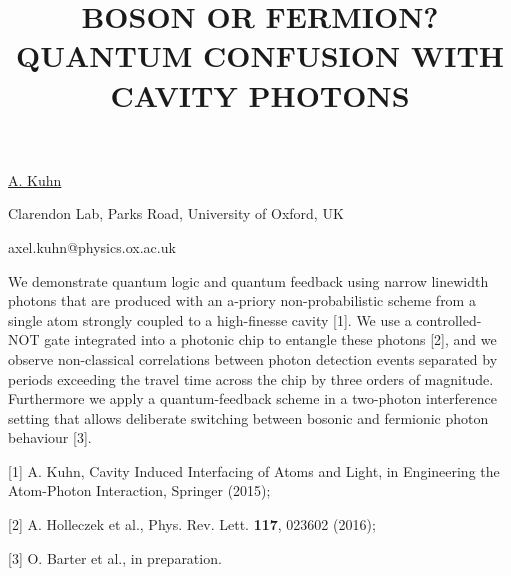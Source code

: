 \title{BOSON OR FERMION? QUANTUM CONFUSION WITH CAVITY PHOTONS}

\underline{A. Kuhn} 

{\normalsize{\vspace{-4mm}
Clarendon Lab, Parks Road,
University of Oxford,
UK

\email axel.kuhn@physics.ox.ac.uk}}

We demonstrate quantum logic and quantum feedback using narrow linewidth photons that are produced with an a-priory non-probabilistic scheme from a single atom strongly coupled to a high-finesse cavity [1]. We use a controlled-NOT gate integrated into a photonic chip to entangle these photons [2], and we observe non-classical correlations between photon detection events separated by periods exceeding the travel time across the chip by three orders of magnitude. Furthermore we apply a quantum-feedback scheme in a two-photon interference setting that allows deliberate switching between bosonic and fermionic photon behaviour [3].

{\normalsize
[1] A. Kuhn, Cavity Induced Interfacing of Atoms and Light, in Engineering the Atom-Photon Interaction, Springer (2015);
\vsp

[2] A. Holleczek et al., Phys. Rev. Lett. \textbf{117}, 023602 (2016);
\vsp

[3] O. Barter et al., in preparation.
}

\vspace{\baselineskip} 